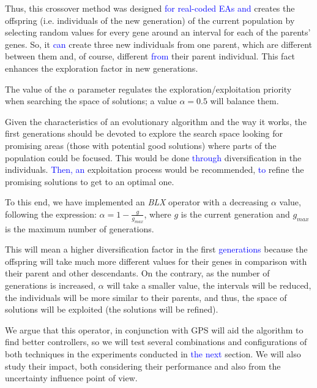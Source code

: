 \documentclass[10pt,journal,compsoc]{IEEEtran}
\begin{document}
Thus, this crossover method was designed \textcolor{blue}{for real-coded EAs \cite{blx2008} and} creates the offspring (i.e. individuals of the new generation) of the current population by selecting random values for every gene around an interval for each of the parents' genes. So, it \textcolor{blue}{can} create three new individuals from one parent, which are different between them and, of course, different \textcolor{blue}{from} their parent individual. This fact enhances the exploration factor in new generations.

The value of the $\alpha$ parameter regulates the exploration/exploitation priority when searching the space of solutions; a value $\alpha = 0.5$ will balance them.

Given the characteristics of an evolutionary algorithm and the way it works, the first generations should be devoted to explore the search space looking for promising areas (those with potential good solutions) where parts of the population could be focused. This would be done \textcolor{blue}{through} diversification in the individuals. \textcolor{blue}{Then, an} exploitation process would be recommended, \textcolor{blue}{to} refine the promising solutions to get to an optimal one.

To this end, we have implemented an \textit{BLX} operator with a decreasing $\alpha$ value, following
the expression: \mbox{$\alpha =1-\frac{g}{g_{max}}$}, where $g$ is the
current generation and $g_{max}$ is the maximum number of generations.

This will mean a higher diversification factor in the first \textcolor{blue}{generations} because the offspring will take much more different values for their genes in comparison with their parent and other descendants. %
On the contrary, as the number of generations is increased, $\alpha$ will take a smaller value, the intervals will be reduced, the individuals will be more similar to their parents, and thus, the space of solutions will be exploited (the solutions will be refined).

We argue that this operator, in conjunction with GPS will aid the
algorithm to find better controllers, so we will test several
combinations and configurations of both techniques in the experiments
conducted in \textcolor{blue}{the next} section. We will also study their impact, both considering their performance and also from the uncertainty influence point of view. 
\end{document}
